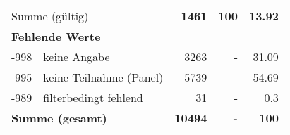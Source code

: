 \begin{longtable}{lXrrr}
     \midrule
     \multicolumn{2}{l}{Summe (gültig)} &
       \textbf{\num{1461}} &
     \textbf{100} &
       \textbf{\num[round-mode=places,round-precision=2]{13,92}} \\
     \multicolumn{5}{l}{\textbf{Fehlende Werte}}\\
       -998 &
       keine Angabe &
         \num{3263} &
        - &
         \num[round-mode=places,round-precision=2]{31,09} \\
       -995 &
       keine Teilnahme (Panel) &
         \num{5739} &
        - &
         \num[round-mode=places,round-precision=2]{54,69} \\
       -989 &
       filterbedingt fehlend &
         \num{31} &
        - &
         \num[round-mode=places,round-precision=2]{0,3} \\
     \midrule
     \multicolumn{2}{l}{\textbf{Summe (gesamt)}} &
          \textbf{\num{10494}} &
        \textbf{-} &
        \textbf{100} \\
     \bottomrule
     \end{longtable}
     
